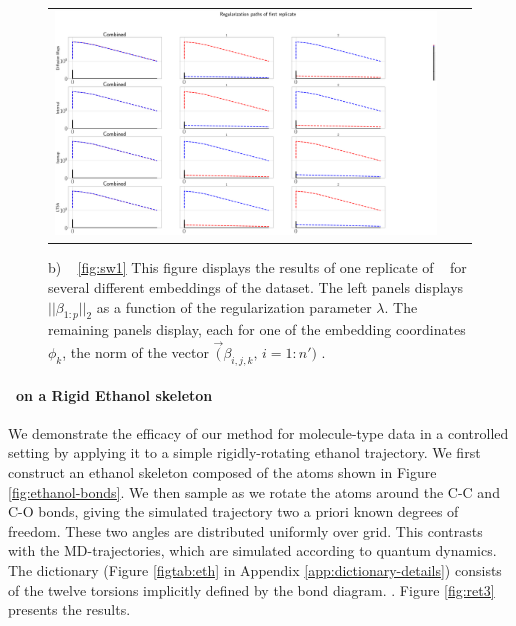 {%
\begin{figure}[hbt!]
\begin{tabular}{ccc}
\includegraphics[width = \textwidth]{../Figures/revision_temp/swissroll}
\label{fig:sw} &
&
\end{tabular}
\caption{  b) \srdata~ \ref{fig:sw1} This figure displays the results of one replicate of \ouralg~ for several different embeddings of the \srdata dataset. The left panels displays $||\beta_{1:p}||_2$ as a function of the regularization parameter $\lambda$. The remaining panels display, each for one of the embedding coordinates $\phi_k$, the norm of the vector $\vec(\beta_{i,j,k},\,i=1:n')$ .
 }
\end{figure}

\paragraph{\ouralg~on a Rigid Ethanol skeleton}\label{sec:rigid}

We demonstrate the efficacy of our method for molecule-type data in a controlled setting by applying it to a simple rigidly-rotating ethanol trajectory.  We first construct an ethanol skeleton composed of the atoms shown in Figure \ref{fig:ethanol-bonds}.  We then sample as we rotate the atoms around the C-C and C-O bonds, giving the simulated trajectory two a priori known degrees of freedom. These two angles are distributed uniformly over grid. This contrasts with the MD-trajectories, which are simulated according to quantum dynamics.
The dictionary (Figure \ref{figtab:eth} in Appendix \ref{app:dictionary-details}) consists of the twelve torsions implicitly defined by the bond diagram. .  Figure \ref{fig:ret3} presents the results.  

}
